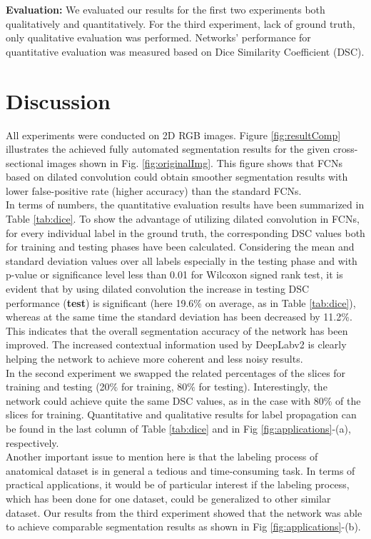 \documentclass[a4paper]{mva_style}
\begin{document}
\textbf{Evaluation:} 
We evaluated our results for the first two experiments both qualitatively and quantitatively. For the third experiment, lack of ground truth, only qualitative evaluation was performed. Networks' performance for quantitative evaluation was measured based on Dice Similarity Coefficient (DSC).
\section{Discussion}
\label{sec:discussion}
All experiments were conducted on 2D RGB images. Figure \ref{fig:resultComp} illustrates the achieved fully automated segmentation results for the given cross-sectional images shown in Fig. \ref{fig:originalImg}. This figure shows that FCNs based on dilated convolution could obtain smoother segmentation results with lower false-positive rate (higher accuracy) than the standard FCNs. \\ 
\indent In terms of numbers, the quantitative evaluation results have been summarized in Table \ref{tab:dice}. To show the advantage of utilizing dilated convolution in FCNs, for every individual label in the ground truth, the corresponding DSC values both for training and testing phases have been calculated. Considering the mean and standard deviation values over all labels especially in the testing phase and with p-value or significance level less than 0.01 for Wilcoxon signed rank test, it is evident that by using dilated convolution the increase in testing DSC performance (\textbf{\text{\boldmath$\Delta$}test}) is significant (here 19.6\% on average, as in Table \ref{tab:dice}), whereas at the same time the standard deviation has been decreased by 11.2\%. This indicates that the overall segmentation accuracy of the network has been improved. The increased contextual information used by DeepLabv2 is clearly helping the network to achieve more coherent and less noisy results.\\
\indent In the second experiment we swapped the related percentages of the slices for training and testing (20$\%$ for training, 80$\%$ for testing). Interestingly, the network could achieve quite the same DSC values, as in the case with 80$\%$ of the slices for training. Quantitative and qualitative results for label propagation can be found in the last column of Table \ref{tab:dice} and in Fig \ref{fig:applications}-(a), respectively.\\
\indent Another important issue to mention here is that the labeling process of anatomical dataset is in general a tedious and time-consuming task. In terms of practical applications, it would be of particular interest if the labeling process, which has been done for one dataset, could be generalized to other similar dataset. Our results from the third experiment showed that the network was able to achieve comparable segmentation results as shown in Fig \ref{fig:applications}-(b).
\end{document}
